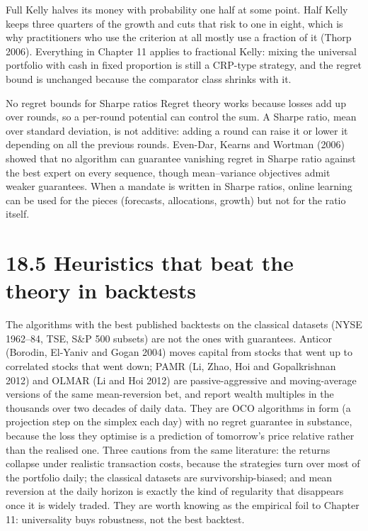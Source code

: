 \documentclass[11pt,a4paper,openany]{book}
\begin{document}
Full Kelly halves its money with probability one half at some point. Half Kelly keeps three quarters of the growth and cuts that risk to one in eight, which is why practitioners who use the criterion at all mostly use a fraction of it (Thorp 2006). Everything in Chapter 11 applies to fractional Kelly: mixing the universal portfolio with cash in fixed proportion is still a CRP-type strategy, and the regret bound is unchanged because the comparator class shrinks with it.

\begin{bwarn}{No regret bounds for Sharpe ratios}
Regret theory works because losses add up over rounds, so a per-round potential can control the sum. A Sharpe ratio, mean over standard deviation, is not additive: adding a round can raise it or lower it depending on all the previous rounds. Even-Dar, Kearns and Wortman (2006) showed that no algorithm can guarantee vanishing regret in Sharpe ratio against the best expert on every sequence, though mean–variance objectives admit weaker guarantees. When a mandate is written in Sharpe ratios, online learning can be used for the pieces (forecasts, allocations, growth) but not for the ratio itself.
\end{bwarn}

\section*{18.5 Heuristics that beat the theory in backtests}\label{ch18-heuristics}

The algorithms with the best published backtests on the classical datasets (NYSE 1962–84, TSE, S\&P 500 subsets) are not the ones with guarantees. Anticor (Borodin, El-Yaniv and Gogan 2004) moves capital from stocks that went up to correlated stocks that went down; PAMR (Li, Zhao, Hoi and Gopalkrishnan 2012) and OLMAR (Li and Hoi 2012) are passive-aggressive and moving-average versions of the same mean-reversion bet, and report wealth multiples in the thousands over two decades of daily data. They are OCO algorithms in form (a projection step on the simplex each day) with no regret guarantee in substance, because the loss they optimise is a prediction of tomorrow's price relative rather than the realised one. Three cautions from the same literature: the returns collapse under realistic transaction costs, because the strategies turn over most of the portfolio daily; the classical datasets are survivorship-biased; and mean reversion at the daily horizon is exactly the kind of regularity that disappears once it is widely traded. They are worth knowing as the empirical foil to Chapter 11: universality buys robustness, not the best backtest.
\end{document}
